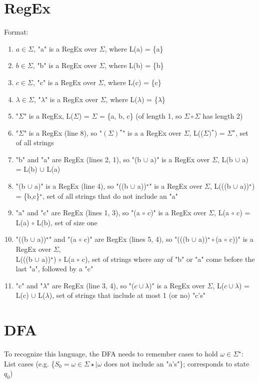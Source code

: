 \documentclass{article}
\begin{document}
\section*{RegEx}
Format:
\begin{enumerate}
    \item $a\in\Sigma$, "a" is a RegEx over $\Sigma$, where L(a) = \{a\}
    \item $b\in\Sigma$, "b" is a RegEx over $\Sigma$, where L(b) = \{b\}
    \item $c\in\Sigma$, "c" is a RegEx over $\Sigma$, where L(c) = \{c\}
    \item $\lambda\in\Sigma$, "$\lambda$" is a RegEx over $\Sigma$, where L($\lambda$) = \{$\lambda$\} 
    \item "$\Sigma$" is a RegEx, L($\Sigma$) = $\Sigma$ = \{a, b, c\} (of length 1, so $\Sigma\circ\Sigma$ has length 2)
    \item "$\Sigma$" is a RegEx (line 8), so "$(\Sigma)^\star$" is a  a RegEx over $\Sigma$, L(($\Sigma)^\star$) = $\Sigma^\star$, set of all strings
    \item "b" and "a" are RegEx (lines 2, 1), so "(b $\cup$ a)" is a RegEx over $\Sigma$, L(b $\cup$ a) = L(b) $\cup$ L(a)
    \item "(b $\cup$ a)" is a RegEx (line 4), so "((b $\cup$ a))$^\star$" is a RegEx over $\Sigma$, L(((b $\cup$ a))$^\star$) = \{b,c\}$^\star$, set of all strings
    that do not include an "a"
    \item "a" and "c" are RegEx (lines 1, 3), so "(a $\circ$ c)" is a RegEx over $\Sigma$, L(a $\circ$ c) = L(a) $\circ$ L(b), set of size one
    \item "((b $\cup$ a))$^\star$" and "(a $\circ$ c)" are RegEx (lines 5, 4), so "(((b $\cup$ a))$^\star\circ$(a $\circ$ c))" is a RegEx over $\Sigma$, \\
    L(((b $\cup$ a))$^\star$) $\circ$ L(a $\circ$ c), set of strings where any of "b" or "a" come before the last "a", followed by a "c"
    \item "c" and "$\lambda$" are RegEx (line 3, 4), so "($c\cup\lambda$)" is a RegEx over $\Sigma$, L($c\cup\lambda$) = L(c) $\cup$ L($\lambda$), set of strings that
    include at most 1 (or no) "c's"
\end{enumerate}

\section*{DFA}
To recognize this language, the DFA needs to remember cases to hold $\omega\in\Sigma^\star$: \\
List cases (e.g. \{$S_0=\omega\in\Sigma\star|\omega$ does not include an "a's"\}; corresponds to state $q_0$)
\end{document}
